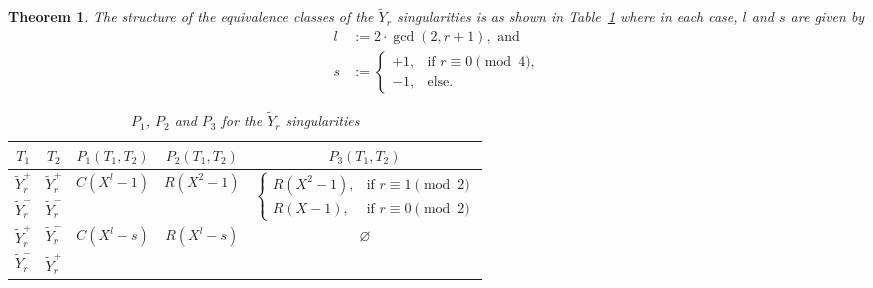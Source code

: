 \documentclass[noend]{amsproc}
\newtheorem{theorem}{Theorem}
\theoremstyle{definition}
\newcommand{\tY}{\widetilde{Y}}
\begin{document}
\begin{theorem}
The structure of the equivalence classes of the $\tY_r$ singularities is as
shown in Table~\ref{tab:tYr_equivalences} where in each case, $l$ and $s$ are
given by
\begin{align*}
l &:= 2\cdot{\gcd(2, r+1)}, \text{ and} \\
s &:=
\begin{cases}
  +1,  &\text{if } r \equiv 0 \pmod{4}, \\
  -1, &\text{else.}
\end{cases}
\end{align*}

\begin{table}[htb]
\centering
\caption{$P_1$, $P_2$ and $P_3$ for the $\tY_r$ singularities}
\label{tab:tYr_equivalences}
\begin{tabular}{|c|c||c|c|c|}
\hline

$T_1$ & $T_2$ & $P_1(T_1, T_2)$ & $P_2(T_1, T_2)$ & $P_3(T_1, T_2)$ \\
\hline\hline

$\tY_r^+$ & $\tY_r^+$ &
\multirow{2}{*}{$C(X^l-1)$} &
\multirow{2}{*}{$R(X^2-1)$} &
\multirow{2}{*}{$\begin{cases}
  R(X^2-1), &\text{if } r \equiv 1 \pmod{2} \\
  R(X-1),   &\text{if } r \equiv 0 \pmod{2}
\end{cases}$} \\
\cline{1-2}

$\tY_r^-$ & $\tY_r^-$ &
&
&
\\
\hline

$\tY_r^+$ & $\tY_r^-$ &
\multirow{2}{*}{$C(X^l-s)$} &
\multirow{2}{*}{$R(X^l-s)$} &
\multirow{2}{*}{$\varnothing$} \\
\cline{1-2}

$\tY_r^-$ & $\tY_r^+$ &
&
&
\\
\hline

\end{tabular}
\end{table}

\end{theorem}
\end{document}

